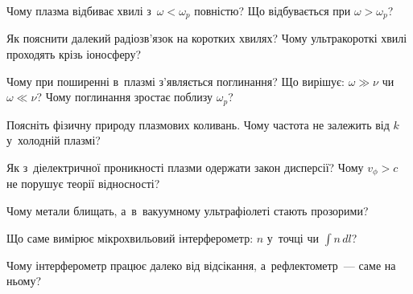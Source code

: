 \begin{Questions}
\begin{quizlist}
\item Чому плазма відбиває хвилі з~$\omega<\omega_p$ повністю? Що відбувається при
		  $\omega>\omega_p$?

\item Як пояснити далекий радіозв'язок на коротких хвилях? Чому ультракороткі
		  хвилі проходять крізь іоносферу?

\item Чому при поширенні в~плазмі з'являється поглинання? Що вирішує:
		  $\omega\gg\nu$ чи $\omega\ll\nu$? Чому поглинання зростає поблизу $\omega_p$?

\item Поясніть фізичну природу плазмових коливань. Чому частота не залежить від
		  $k$ у~холодній плазмі?

\item Як з~діелектричної проникності плазми одержати закон дисперсії? Чому
		  $v_\phi>c$ не порушує теорії відносності?

\item Чому метали блищать, а~в~вакуумному ультрафіолеті стають прозорими?

\item Що саме вимірює мікрохвильовий інтерферометр: $n$ у~точці чи $\int n\,dl$?

\item Чому інтерферометр працює далеко від відсікання, а~рефлектометр~--- саме на ньому?

\end{quizlist}
\end{Questions}

